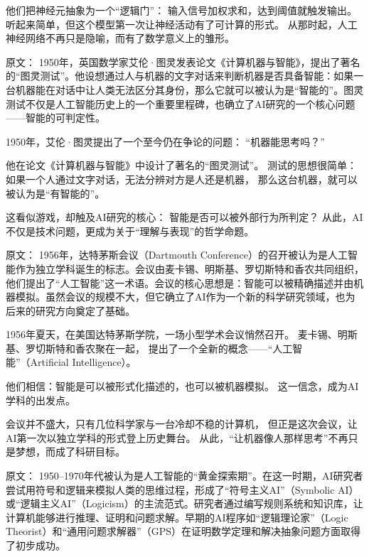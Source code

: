 他们把神经元抽象为一个“逻辑门”：
输入信号加权求和，达到阈值就触发输出。
听起来简单，但这个模型第一次让神经活动有了可计算的形式。
从那时起，人工神经网络不再只是隐喻，而有了数学意义上的雏形。

原文：
1950年，英国数学家艾伦·图灵发表论文《计算机器与智能》，提出了著名的“图灵测试”。他设想通过人与机器的文字对话来判断机器是否具备智能：如果一台机器能在对话中让人类无法区分其身份，那么它就可以被认为是“智能的”。图灵测试不仅是人工智能历史上的一个重要里程碑，也确立了AI研究的一个核心问题——智能的可判定性。


1950年，艾伦·图灵提出了一个至今仍在争论的问题：
“机器能思考吗？”

他在论文《计算机器与智能》中设计了著名的“图灵测试”。
测试的思想很简单：
如果一个人通过文字对话，无法分辨对方是人还是机器，
那么这台机器，就可以被认为是“有智能的”。

这看似游戏，却触及AI研究的核心：
智能是否可以被外部行为所判定？
从此，AI不仅是技术问题，更成为关于“理解与表现”的哲学命题。

原文：
1956年，达特茅斯会议（Dartmouth Conference）的召开被认为是人工智能作为独立学科诞生的标志。会议由麦卡锡、明斯基、罗切斯特和香农共同组织，他们提出了“人工智能”这一术语。会议的核心思想是：智能可以被精确描述并由机器模拟。虽然会议的规模不大，但它确立了AI作为一个新的科学研究领域，也为后来的研究方向奠定了基础。


1956年夏天，在美国达特茅斯学院，一场小型学术会议悄然召开。
麦卡锡、明斯基、罗切斯特和香农聚在一起，
提出了一个全新的概念——“人工智能”（Artificial Intelligence）。

他们相信：智能是可以被形式化描述的，也可以被机器模拟。
这一信念，成为AI学科的出发点。

会议并不盛大，只有几位科学家与一台冷却不稳的计算机，
但正是这次会议，让AI第一次以独立学科的形式登上历史舞台。
从此，“让机器像人那样思考”不再只是梦想，而成了科研目标。

原文：
1950–1970年代被认为是人工智能的“黄金探索期”。在这一时期，AI研究者尝试用符号和逻辑来模拟人类的思维过程，形成了“符号主义AI”（Symbolic AI）或“逻辑主义AI”（Logicism）的主流范式。研究者通过编写规则系统和知识库，让计算机能够进行推理、证明和问题求解。早期的AI程序如“逻辑理论家”（Logic Theorist）和“通用问题求解器”（GPS）在证明数学定理和解决抽象问题方面取得了初步成功。

